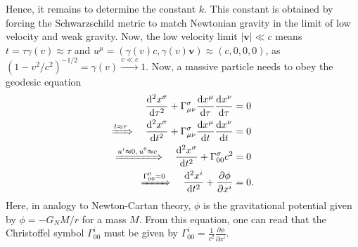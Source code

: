 \documentclass[a4paper,11pt]{article}
\numberwithin{equation}{section}
\newcommand\vect[1]{\ensuremath{\bm{#1}}}
\begin{document}
{Hence, it remains to determine the constant $k$. This constant is obtained by forcing the Schwarzschild metric to match Newtonian gravity in the limit of low velocity and weak gravity. Now, the low velocity limit $|\vect{v}| \ll c$ means $t = \tau\gamma(v) \approx \tau$ and $u^\mu = (\gamma(v)c, \gamma(v)\vect{v}) \approx (c, 0, 0, 0)$, as $(1-v^2/c^2)^{-1/2} = \gamma(v) \xrightarrow{v \ll c} 1$. Now, a massive particle needs to obey the geodesic equation \begin{align}
	\begin{aligned}
\frac{\mathrm{d}^2 x^\sigma}{\mathrm{d}\tau^2} + \Gamma^\sigma_{\mu\nu}\frac{\mathrm{d}x^\mu}{\mathrm{d}\tau}\frac{\mathrm{d}x^\nu}{\mathrm{d}\tau} &= 0 \\
\xRightarrow{t\approx \tau} \quad 
\frac{\mathrm{d}^2 x^\sigma}{\mathrm{d}t^2} + \Gamma^\sigma_{\mu\nu}\frac{\mathrm{d}x^\mu}{\mathrm{d}t}\frac{\mathrm{d}x^\nu}{\mathrm{d}t} &= 0 \\
\xRightarrow{u^i \approx 0, \, u^0 \approx c} \quad \frac{\mathrm{d}^2 x^\sigma}{\mathrm{d}t^2} + \Gamma^\sigma_{00} c^2 &= 0 \\
\xRightarrow{\Gamma^0_{00}=0} \quad \frac{\mathrm{d}^2x^i}{\mathrm{d}t^2} + \frac{\partial \phi}{\partial x^i} &= 0.
\end{aligned}\end{align} Here, in analogy to Newton-Cartan theory, $\phi$ is the gravitational potential given by $\phi = -G_N M/r$ for a mass $M$. From this equation, one can read that the Christoffel symbol $\Gamma^i_{00}$ must be given by $\Gamma^i_{00} = \frac{1}{c^2}\frac{\partial \phi}{\partial x^i}$. 

}
\end{document}
